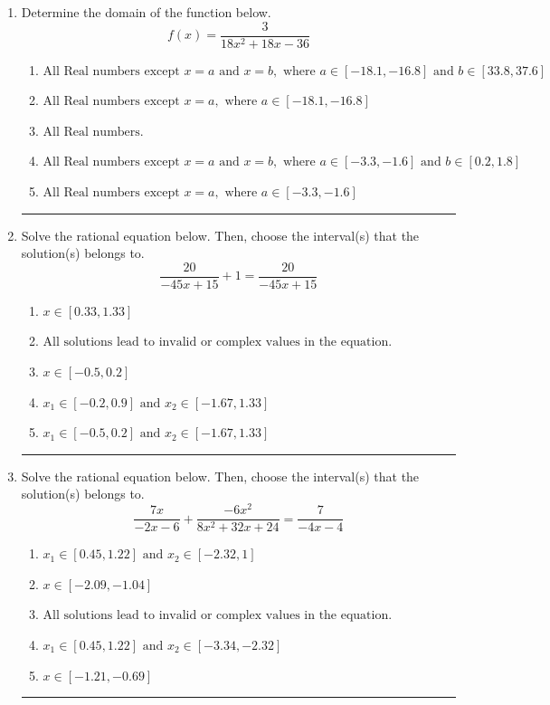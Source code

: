 \documentclass[14pt]{extbook}
\newcommand{\litem}[1]{\item#1\hspace*{-1cm}\rule{\textwidth}{0.4pt}}
\begin{document}
\begin{enumerate}
{\begin{enumerate}[label=\Alph*.]
\end{enumerate} }
\litem{
Determine the domain of the function below.\[ f(x) = \frac{3}{18x^{2} +18 x -36} \]\begin{enumerate}[label=\Alph*.]
\item \( \text{All Real numbers except } x = a \text{ and } x = b, \text{ where } a \in [-18.1, -16.8] \text{ and } b \in [33.8, 37.6] \)
\item \( \text{All Real numbers except } x = a, \text{ where } a \in [-18.1, -16.8] \)
\item \( \text{All Real numbers.} \)
\item \( \text{All Real numbers except } x = a \text{ and } x = b, \text{ where } a \in [-3.3, -1.6] \text{ and } b \in [0.2, 1.8] \)
\item \( \text{All Real numbers except } x = a, \text{ where } a \in [-3.3, -1.6] \)

\end{enumerate} }
\litem{
Solve the rational equation below. Then, choose the interval(s) that the solution(s) belongs to.\[ \frac{20}{-45x + 15} + 1 = \frac{20}{-45x + 15} \]\begin{enumerate}[label=\Alph*.]
\item \( x \in [0.33,1.33] \)
\item \( \text{All solutions lead to invalid or complex values in the equation.} \)
\item \( x \in [-0.5,0.2] \)
\item \( x_1 \in [-0.2, 0.9] \text{ and } x_2 \in [-1.67,1.33] \)
\item \( x_1 \in [-0.5, 0.2] \text{ and } x_2 \in [-1.67,1.33] \)

\end{enumerate} }
\litem{
Solve the rational equation below. Then, choose the interval(s) that the solution(s) belongs to.\[ \frac{7x}{-2x -6} + \frac{-6x^{2}}{8x^{2} +32 x + 24} = \frac{7}{-4x -4} \]\begin{enumerate}[label=\Alph*.]
\item \( x_1 \in [0.45, 1.22] \text{ and } x_2 \in [-2.32,1] \)
\item \( x \in [-2.09,-1.04] \)
\item \( \text{All solutions lead to invalid or complex values in the equation.} \)
\item \( x_1 \in [0.45, 1.22] \text{ and } x_2 \in [-3.34,-2.32] \)
\item \( x \in [-1.21,-0.69] \)


\end{enumerate}}
\end{enumerate}
\end{document}
